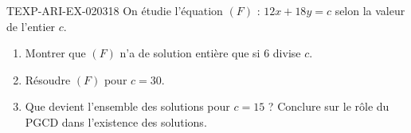 \begin{exercice}{TEXP-ARI-EX-020}{3}{18}
On étudie l'équation $(F)$ : $12x+18y=c$ selon la valeur de l'entier $c$.
\begin{enumerate}
  \item Montrer que $(F)$ n'a de solution entière que si $6$ divise $c$.
  \item Résoudre $(F)$ pour $c=30$.
  \item Que devient l'ensemble des solutions pour $c=15$ ? Conclure sur le rôle
        du PGCD dans l'existence des solutions.
\end{enumerate}
\end{exercice}
